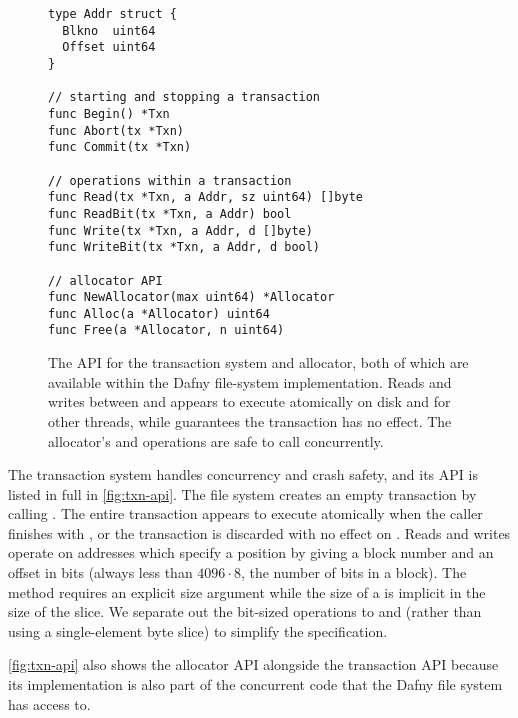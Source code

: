 \begin{figure}
\begin{verbatim}
type Addr struct {
  Blkno  uint64
  Offset uint64
}

// starting and stopping a transaction
func Begin() *Txn
func Abort(tx *Txn)
func Commit(tx *Txn)

// operations within a transaction
func Read(tx *Txn, a Addr, sz uint64) []byte
func ReadBit(tx *Txn, a Addr) bool
func Write(tx *Txn, a Addr, d []byte)
func WriteBit(tx *Txn, a Addr, d bool)

// allocator API
func NewAllocator(max uint64) *Allocator
func Alloc(a *Allocator) uint64
func Free(a *Allocator, n uint64)
\end{verbatim}
  \caption{The API for the transaction system and allocator, both of which are
    available within the Dafny file-system implementation. Reads and writes
    between  and  appears to execute atomically on disk and
    for other threads, while  guarantees the transaction has no
    effect. The allocator's  and  operations are safe to call
    concurrently.}
\label{fig:txn-api}
\end{figure}

The transaction system handles concurrency and crash safety, and its
API is listed in full in \autoref{fig:txn-api}.  The file system
creates an empty transaction by calling . The entire
transaction appears to execute atomically when the caller finishes
with , or the transaction is discarded with no effect on
. Reads and writes operate on addresses which specify a
position by giving a block number and an offset in bits (always less
than $4096 \cdot 8$, the number of bits in a block). The 
method requires an explicit size argument while the size of a
 is implicit in the size of the  slice. We separate
out the bit-sized operations to  and  (rather
than using a single-element byte slice) to simplify the specification.

\autoref{fig:txn-api} also shows the allocator API alongside the
transaction API because its implementation is also part of the
concurrent code that the Dafny file system has access to.



